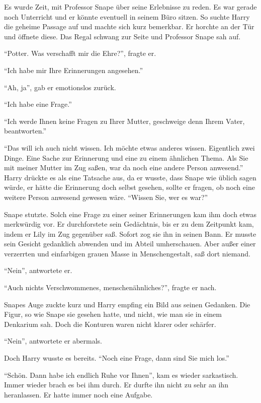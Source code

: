 Es wurde Zeit, mit Professor Snape über seine Erlebnisse zu reden. Es war gerade noch Unterricht und er könnte eventuell in seinem Büro sitzen. So suchte Harry die geheime Passage auf und machte sich kurz bemerkbar. Er horchte an der Tür und öffnete diese. Das Regal schwang zur Seite und Professor Snape sah auf.

\enquote{Potter. Was verschafft mir die Ehre?}, fragte er.

\enquote{Ich habe mir Ihre Erinnerungen angesehen.}

\enquote{Ah, ja}, gab er emotionslos zurück.

\enquote{Ich habe eine Frage.}

\enquote{Ich werde Ihnen keine Fragen zu Ihrer Mutter, geschweige denn Ihrem Vater, beantworten.}

\enquote{Das will ich auch nicht wissen. Ich möchte etwas anderes wissen. Eigentlich zwei Dinge. Eine Sache zur Erinnerung und eine zu einem ähnlichen Thema. \gst Als Sie mit meiner Mutter im Zug saßen, war da noch eine andere Person anwesend.} Harry drückte es als eine Tatsache aus, da er wusste, dass Snape wie üblich sagen würde, er hätte die Erinnerung doch selbst gesehen, sollte er fragen, ob noch eine weitere Person anwesend gewesen wäre. \enquote{Wissen Sie, wer es war?}

Snape stutzte. Solch eine Frage zu einer seiner Erinnerungen kam ihm doch etwas merkwürdig vor. Er durchforstete sein Gedächtnis, bis er zu dem Zeitpunkt kam, indem er Lily im Zug gegenüber saß. Sofort zog sie ihn in seinen Bann. Er musste sein Gesicht gedanklich abwenden und im Abteil umherschauen. Aber außer einer verzerrten und einfarbigen grauen Masse in Menschengestalt, saß dort niemand.

\enquote{Nein}, antwortete er.

\enquote{Auch nichts Verschwommenes, menschenähnliches?}, fragte er nach.

Snapes Auge zuckte kurz und Harry empfing ein Bild aus seinen Gedanken. Die Figur, so wie Snape sie gesehen hatte, und nicht, wie man sie in einem Denkarium sah. Doch die Konturen waren nicht klarer oder schärfer.

\enquote{Nein}, antwortete er abermals.

Doch Harry wusste es bereits. \enquote{Noch eine Frage, dann sind Sie mich los.}

\enquote{Schön. Dann habe ich endlich Ruhe vor Ihnen}, kam es wieder sarkastisch. Immer wieder brach es bei ihm durch. Er durfte ihn nicht zu sehr an ihn heranlassen. Er hatte immer noch eine Aufgabe.

